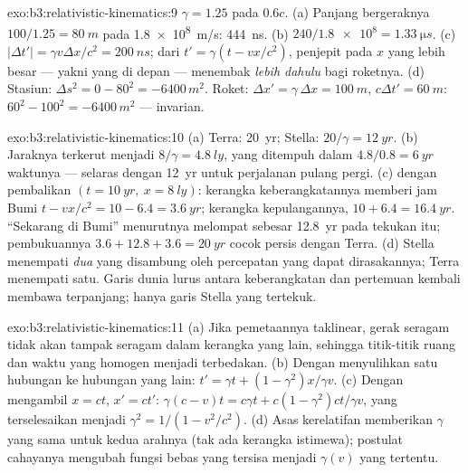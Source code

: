 \begin{solution}{exo:b3:relativistic-kinematics:9}
$\gamma = 1.25$ pada $0.6c$. (a) Panjang bergeraknya $100/1.25 = \qty{80}{m}$
pada \qty{1.8e8}{m/s}: \qty{444}{ns}. (b) $240/\num{1.8e8} =
\qty{1.33}{\micro s}$. (c) $|\Delta t'| = \gamma v\Delta x/c^2 =
\qty{200}{ns}$; dari $t' = \gamma(t - vx/c^2)$, penjepit pada $x$ yang
lebih besar --- yakni yang di depan --- menembak \emph{lebih dahulu}
bagi roketnya. (d)
Stasiun: $\Delta s^2 = 0 - 80^2 = -6400\,\unit{m^2}$. Roket: $\Delta
x' = \gamma\,\Delta x = \qty{100}{m}$, $c\Delta t' = \qty{60}{m}$:
$60^2 - 100^2 = -6400\,\unit{m^2}$ --- invarian.
\end{solution}

\begin{solution}{exo:b3:relativistic-kinematics:10}
(a) Terra: \qty{20}{yr}; Stella: $20/\gamma = \qty{12}{yr}$. (b)
Jaraknya terkerut menjadi $8/\gamma = \qty{4.8}{ly}$, yang ditempuh dalam $4.8/0.8
= \qty{6}{yr}$ waktunya --- selaras dengan \qty{12}{yr} untuk
perjalanan pulang pergi. (c)  dengan  pembalikan $(t =
\qty{10}{yr},\ x = \qty{8}{ly})$: kerangka keberangkatannya memberi jam
Bumi $t - vx/c^2 = 10 - 6.4 = \qty{3.6}{yr}$; kerangka kepulangannya, $10 +
6.4 = \qty{16.4}{yr}$. ``Sekarang di Bumi'' menurutnya melompat sebesar \qty{12.8}{yr}
pada tekukan itu; pembukuannya $3.6 + 12.8 + 3.6 = \qty{20}{yr}$ cocok
persis dengan Terra. (d) Stella menempati \emph{dua} 
yang disambung oleh percepatan yang dapat dirasakannya; Terra menempati
satu. Garis dunia lurus antara  keberangkatan dan pertemuan
kembali membawa  terpanjang; hanya garis Stella yang tertekuk.
\end{solution}

\begin{solution}{exo:b3:relativistic-kinematics:11}
(a) Jika pemetaannya taklinear, gerak seragam tidak akan tampak seragam
dalam kerangka yang lain, sehingga titik-titik ruang dan waktu yang
homogen menjadi terbedakan. (b) Dengan menyulihkan satu hubungan ke
hubungan yang lain: $t' = \gamma t +
(1 - \gamma^2)x/\gamma v$. (c) Dengan mengambil $x = ct$, $x' = ct'$:
$\gamma(c - v)t = c\gamma t + c(1 - \gamma^2)ct/\gamma v$, yang
terselesaikan menjadi $\gamma^2 = 1/(1 - v^2/c^2)$. (d) Asas
kerelatifan memberikan $\gamma$ yang sama untuk kedua arahnya (tak ada
kerangka istimewa); postulat cahayanya mengubah fungsi bebas yang
tersisa menjadi $\gamma(v)$ yang tertentu.
\end{solution}

